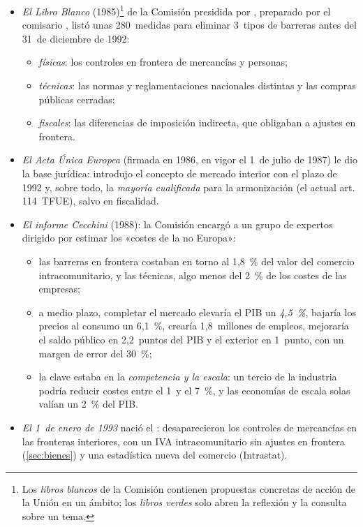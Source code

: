 \documentclass[11pt]{article}
\begin{document}
\begin{itemize}
\item \emph{El Libro Blanco} (1985)\footnote{Los \emph{libros blancos} de la Comisión contienen propuestas concretas de acción de la Unión en un ámbito; los \emph{libros verdes} solo abren la reflexión y la consulta sobre un tema.} de la Comisión presidida por , preparado por el comisario , listó unas 280~medidas para eliminar 3~tipos de barreras antes del 31~de diciembre de 1992:
  \begin{itemize}
  \item \emph{físicas}: los controles en frontera de mercancías y personas;
  \item \emph{técnicas}: las normas y reglamentaciones nacionales distintas y las compras públicas cerradas;
  \item \emph{fiscales}: las diferencias de imposición indirecta, que obligaban a ajustes en frontera.
  \end{itemize}
\item \emph{El Acta Única Europea} (firmada en 1986, en vigor el 1~de julio de 1987) le dio la base jurídica: introdujo el concepto de mercado interior con el plazo de 1992 y, sobre todo, la \emph{mayoría cualificada} para la armonización (el actual art. 114~TFUE), salvo en fiscalidad.
\item \emph{El informe Cecchini} (1988): la Comisión encargó a un grupo de expertos dirigido por  estimar los «costes de la no Europa»\nocite{Cecchini1988Comision,Emerson1988Economics,Muns2005Lecturas}:
  \begin{itemize}
  \item las barreras en frontera costaban en torno al 1,8~\% del valor del comercio intracomunitario, y las técnicas, algo menos del 2~\% de los costes de las empresas;
  \item a medio plazo, completar el mercado elevaría el PIB un \emph{4,5~\%}, bajaría los precios al consumo un 6,1~\%, crearía 1,8~millones de empleos, mejoraría el saldo público en 2,2~puntos del PIB y el exterior en 1~punto, con un margen de error del 30~\%\nocite{Cecchini1988Comision};
  \item la clave estaba en la \emph{competencia y la escala}: un tercio de la industria podría reducir costes entre el 1~y el 7~\%, y las economías de escala solas valían un 2~\% del PIB.
  \end{itemize}
\item \emph{El 1~de enero de 1993} nació el : desaparecieron los controles de mercancías en las fronteras interiores, con un IVA intracomunitario sin ajustes en frontera (\ref{sec:bienes}) y una estadística nueva del comercio (Intrastat).
\end{itemize}
\end{document}
